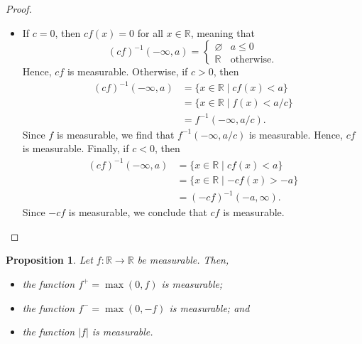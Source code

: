 \documentclass[a4paper, openany]{memoir}
\theoremstyle{definition}
\theoremstyle{plain}
\newtheorem{proposition}[definition]{Proposition}
\begin{document}
\begin{proof}
\begin{itemize}
            \item If $c = 0$, then $cf(x) = 0$ for all $x \in \mathbb{R}$, meaning that
            \[(cf)^{-1}(-\infty, a) = \begin{cases}
                \varnothing & a \leq 0 \\
                \mathbb{R} & \textrm{otherwise}.
            \end{cases}\]
            Hence, $cf$ is measurable. Otherwise, if $c > 0$, then
            \begin{align*}
                (cf)^{-1}(-\infty, a) &= \{x \in \mathbb{R} \mid cf(x) < a\} \\
                &= \{x \in \mathbb{R} \mid f(x) < a/c\} \\
                &= f^{-1}(-\infty, a/c).
            \end{align*}
            Since $f$ is measurable, we find that $f^{-1}(-\infty, a/c)$ is measurable. Hence, $cf$ is measurable. Finally, if $c < 0$, then
            \begin{align*}
                (cf)^{-1}(-\infty, a) &= \{x \in \mathbb{R} \mid cf(x) < a\} \\
                &= \{x \in \mathbb{R} \mid -cf(x) > -a\} \\
                &= (-cf)^{-1}(-a, \infty).
            \end{align*}
            Since $-cf$ is measurable, we conclude that $cf$ is measurable.
        \end{itemize}
    \end{proof}
    \begin{proposition}
        Let $f \colon \mathbb{R} \to \mathbb{R}$ be measurable. Then,
        \begin{itemize}
            \item the function $f^+ = \max(0, f)$ is measurable;
            \item the function $f^- = \max(0, -f)$ is measurable; and
            \item the function $|f|$ is measurable.
        \end{itemize}
    \end{proposition}
\end{document}
